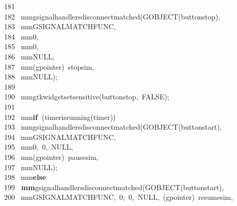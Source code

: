 \documentclass[10pt,a4paper]{article}
\newcommand{\hlstd}[1]{\textcolor[rgb]{0,0,0}{#1}}
\newcommand{\hlkey}[1]{\textcolor[rgb]{0,0,0}{\bf{#1}}}
\newcommand{\hlnum}[1]{\textcolor[rgb]{0.16,0.16,1}{#1}}
\newcommand{\hlline}[1]{\textcolor[rgb]{0.33,0.33,0.33}{#1}}
\begin{document}
{}\hlline{\ 181\ }\hlstd{\\
}\hlline{\ 182\ }\hlstd{\hlstd{ mm}g\textunderscore signal\textunderscore handlers\textunderscore disconnect\textunderscore matched(G\textunderscore OBJECT(button\textunderscore stop),\\
}\hlline{\ 183\ }\hlstd{\hlstd{ mm}G\textunderscore SIGNAL\textunderscore MATCH\textunderscore FUNC,\\
}\hlline{\ 184\ }\hlstd{\hlstd{ mm}}\hlnum{0}\hlstd{,\\
}\hlline{\ 185\ }\hlstd{\hlstd{ mm}}\hlnum{0}\hlstd{,\\
}\hlline{\ 186\ }\hlstd{\hlstd{ mm}NULL,\\
}\hlline{\ 187\ }\hlstd{\hlstd{ mm}(gpointer)\ stop\textunderscore sim,\\
}\hlline{\ 188\ }\hlstd{\hlstd{ mm}NULL);\\
}\hlline{\ 189\ }\hlstd{\\
}\hlline{\ 190\ }\hlstd{\hlstd{ mm}gtk\textunderscore widget\textunderscore set\textunderscore sensitive(button\textunderscore stop,\ FALSE);\\
}\hlline{\ 191\ }\hlstd{\\
}\hlline{\ 192\ }\hlstd{\hlstd{ mm}}\hlkey{if\ }\hlstd{(timer\textunderscore is\textunderscore running(timer))\\
}\hlline{\ 193\ }\hlstd{\hlstd{ mm}g\textunderscore signal\textunderscore handlers\textunderscore disconnect\textunderscore matched(G\textunderscore OBJECT(button\textunderscore start),\\
}\hlline{\ 194\ }\hlstd{\hlstd{ mm}G\textunderscore SIGNAL\textunderscore MATCH\textunderscore FUNC,\\
}\hlline{\ 195\ }\hlstd{\hlstd{ mm}}\hlnum{0}\hlstd{,\ }\hlnum{0}\hlstd{,\ NULL,\\
}\hlline{\ 196\ }\hlstd{\hlstd{ mm}(gpointer)\ pause\textunderscore sim,\\
}\hlline{\ 197\ }\hlstd{\hlstd{ mm}NULL);\\
}\hlline{\ 198\ }\hlstd{\hlstd{ mm}}\hlkey{else\\
}\hlline{\ 199\ }\hlkey{\hlstd{ mm}}\hlstd{g\textunderscore signal\textunderscore handlers\textunderscore disconnect\textunderscore matched(G\textunderscore OBJECT(button\textunderscore start),\\
}\hlline{\ 200\ }\hlstd{\hlstd{ mm}G\textunderscore SIGNAL\textunderscore MATCH\textunderscore FUNC,\ }\hlnum{0}\hlstd{,\ }\hlnum{0}\hlstd{,\ NULL,\ (gpointer)\ resume\textunderscore sim,\\
}
\end{document}
